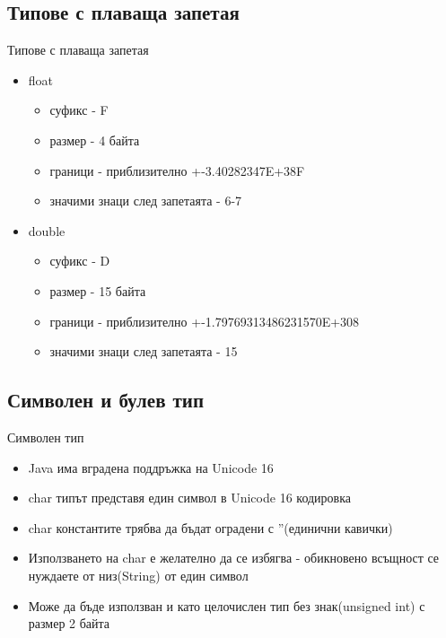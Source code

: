 \documentclass{beamer}
\begin{document}
\subsection{Типове с плаваща запетая}
\begin{frame}{Типове с плаваща запетая}
  \transdissolve
  \begin{itemize}
  \item float
    \begin{itemize}
    \item суфикс - F
    \item размер - 4 байта
    \item граници - приблизително +-3.40282347E+38F
    \item значими знаци след запетаята - 6-7
    \end{itemize} \pause
    \item double
      \begin{itemize}
      \item суфикс - D
      \item размер - 15 байта
      \item граници - приблизително +-1.79769313486231570E+308
      \item значими знаци след запетаята - 15
      \end{itemize}
  \end{itemize}
\end{frame}

\subsection{Символен и булев тип}
\begin{frame}{Символен тип}
  \transdissolve
  \begin{itemize}
  \item Java има вградена поддръжка на Unicode 16 \pause
  \item char типът представя един символ в Unicode 16 кодировка \pause
  \item char константите трябва да бъдат оградени с ''(единични
    кавички) \pause
  \item Използването на char е желателно да се избягва - обикновено
    всъщност се нуждаете от низ(String) от един символ \pause
  \item Може да бъде използван и като целочислен тип без знак(unsigned
    int) с размер 2 байта
  \end{itemize}
\end{frame}
\end{document}
